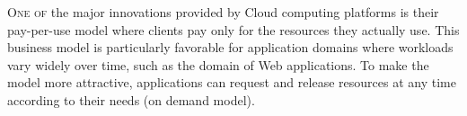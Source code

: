 



\lettrine{O}{ne of} the major innovations provided by Cloud computing
platforms is their pay-per-use model where clients pay only for the resources they actually use. This business model is particularly favorable for application domains where workloads vary widely over time, such as the domain of Web applications. To make the model more attractive, applications can request and release resources at any time according to their needs (on demand model).


